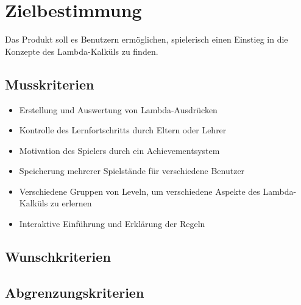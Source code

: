\section{Zielbestimmung}
Das Produkt soll es Benutzern ermöglichen, spielerisch einen Einstieg in die Konzepte des Lambda-Kalküls zu finden.


\subsection{Musskriterien}

\begin{itemize}
\item Erstellung und Auswertung von Lambda-Ausdrücken
\item Kontrolle des Lernfortschritts durch Eltern oder Lehrer
\item Motivation des Spielers durch ein Achievementsystem
\item Speicherung mehrerer Spielstände für verschiedene Benutzer
\item Verschiedene Gruppen von Leveln, um verschiedene Aspekte des Lambda-Kalküls zu erlernen
\item Interaktive Einführung und Erklärung der Regeln
\end{itemize}


\subsection{Wunschkriterien}

\subsection{Abgrenzungskriterien}
